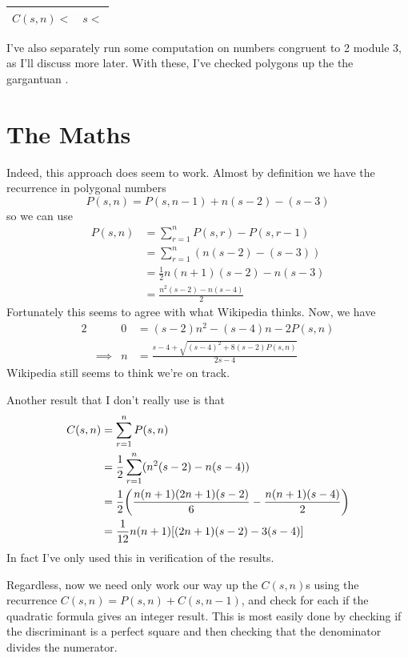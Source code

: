 \begin{longtable}{rr}
\toprule
\boldmath \(C(s, n) <\) & \boldmath \(s <\) \\
\midrule

\endhead
\bottomrule
\end{longtable}

I've also separately run some computation on numbers congruent to 2 module 3, as
I'll discuss more later. With these, I've checked polygons up the the gargantuan
.

\section{The Maths}

Indeed, this approach does seem to work. Almost by definition we have the
recurrence in polygonal numbers
\begin{equation*}
P(s, n) = P(s, n - 1) + n(s - 2) - (s - 3)
\end{equation*}
so we can use
\begin{align*}
P(s, n) &= \sum_{r = 1}^n P(s, r) - P(s, r - 1) \\
    &= \sum_{r = 1}^n (n(s - 2) - (s - 3)) \\
    &= \frac 12 n(n + 1)(s - 2) - n(s - 3) \\
    &= \frac{n^2(s - 2) - n(s - 4)} 2
\end{align*}
Fortunately this seems to agree with what Wikipedia thinks. Now, we have
\begin{alignat*}{2}
&& 0 &= (s - 2)n^2 - (s - 4)n - 2P(s, n) \\
&\implies& n &= \frac{s - 4 + \sqrt{(s - 4)^2 + 8(s - 2)P(s, n)}}{2s - 4}
\end{alignat*}
Wikipedia still seems to think we're on track.

Another result that I don't really use is that
\begin{align*}
C(s, n) &= \sum_{r = 1}^n P(s, n) \\
    &= \frac 12 \sum_{r = 1}^n (n^2(s - 2) - n(s - 4)) \\
    &= \frac 12 \pqty{\frac{n(n + 1)(2n + 1)(s - 2)} 6
                    - \frac{n(n + 1)(s - 4)} 2} \\
    &= \frac 1{12}n(n + 1)\bqty{(2n + 1)(s - 2) - 3(s - 4)}
\end{align*}
In fact I've only used this in verification of the results.

Regardless, now we need only work our way up the \(C(s, n)\)s using the
recurrence \(C(s, n) = P(s, n) + C(s, n - 1)\), and check for each if the
quadratic formula gives an integer result. This is most easily done by checking
if the discriminant is a perfect square and then checking that the denominator
divides the numerator.

